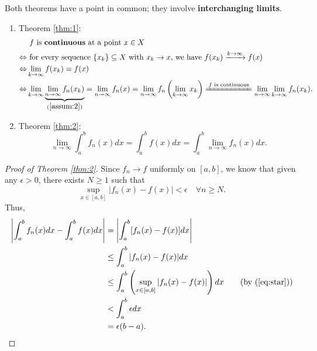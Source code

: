\documentclass[letterpaper, reqno,11pt]{article}
\begin{document}
\begin{remark}
  \normalfont Both theorems have a point in common; they involve {\bf interchanging limits}.
  \begin{enumerate}
  \item Theorem \ref{thm:1}:
    \begin{align*}
      & \text{ $f$ is {\bf continuous} at a point $x \in X$} \\
      \Leftrightarrow & \text{ for every sequence $\{ x_k \} \subseteq X$ with $x_k \to x$, we have $f(x_k) \xrightarrow{k \to \infty} f(x)$} \\
      \Leftrightarrow & \lim_{k \to \infty} f(x_k) = f(x) \\
      \Leftrightarrow & \lim_{k \to \infty} \underbrace{\lim_{n \to \infty} f_n(x_k)}_{(\ref{assum:2})} = \lim_{n \to \infty} f_n(x) = \lim_{n \to \infty} f_n\left(\lim_{k \to \infty} x_k\right) \xlongequal{\text{$f$ is continuous}} \lim_{n \to \infty} \lim_{k \to \infty} f_n(x_k).
    \end{align*}
  \item Theorem \ref{thm:2}:
    $$ \lim_{n \to \infty} \int_a^b f_n(x) dx = \int_a^b f(x) dx = \int_a^b \lim_{n \to \infty} f_n(x) dx. $$
  \end{enumerate}
\end{remark}

\begin{proof}[Proof of Theorem \ref{thm:2}]
  Since $f_n \to f$ uniformly on $[a, b]$, we know that given any $\epsilon > 0$, there exists $N \geq 1$ such that
  \begin{equation*} \label{eq:star}
    \sup_{x \in [a, b]} |f_n(x) - f(x)| < \epsilon \quad \forall n \geq N. \tag{*}
  \end{equation*}
  Thus,
  \begin{align*}
    \left|\int_a^b f_n(x) dx - \int_a^b f(x) dx\right| &= \left|\int_a^b [f_n(x) - f(x)] dx\right| \\
    &\leq \int_a^b |f_n(x) - f(x)| dx \\
    &\leq \int_a^b \left(\sup_{x \in [a, b]} |f_n(x) - f(x)|\right) dx \qquad \text{(by (\ref{eq:star}))} \\
    &< \int_a^b \epsilon dx \\
    &= \epsilon (b - a).
  \end{align*}
\end{proof}
\end{document}

